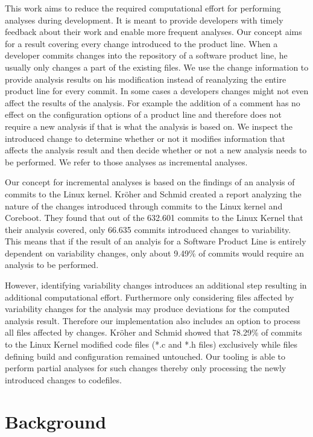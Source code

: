 \documentclass[a4paper]{article}
\begin{document}
This work aims to reduce the required computational effort for performing analyses during development. It is meant to provide developers with timely feedback about their work and enable more frequent analyses. Our concept aims for a result covering every change introduced to the product line. When a developer commits changes into the repository of a software product line, he usually only changes a part of the existing files. We use the change information to provide analysis results on his modification instead of reanalyzing the entire product line for every commit. In some cases a developers changes might not even affect the results of the analysis. For example the addition of a comment has no effect on the configuration options of a product line and therefore does not require a new analysis if that is what the analysis is based on. We inspect the introduced change to determine whether or not it modifies information that affects the analysis result and then decide whether or not a new analysis needs to be performed. We refer to those analyses as incremental analyses.

Our concept for incremental analyses is based on the findings of an analysis of commits to the Linux kernel. Kr\"oher and Schmid \cite{ComAn} created a report analyzing the nature of the changes introduced through commits to the Linux kernel and Coreboot. They found that out of the 632.601 commits to the Linux Kernel that their analysis covered, only 66.635 commits introduced changes to variability. This means that if the result of an analyis for a Software Product Line is entirely dependent on variability changes, only about 9.49\% of commits would require an analysis to be performed.

However, identifying variability changes introduces an additional step resulting in additional computational effort. Furthermore only considering files affected by variability changes for the analysis may produce deviations for the computed analysis result. Therefore our implementation also includes an option to process all files affected by changes.  Kr\"oher and Schmid \cite{ComAn} showed that 78.29\% of commits to the Linux Kernel modified code files (*.c and *.h files) exclusively while files defining build and configuration remained untouched. Our tooling is able to perform partial analyses for such changes thereby only processing the newly introduced changes to codefiles.



\clearpage
\section{Background}
\end{document}
